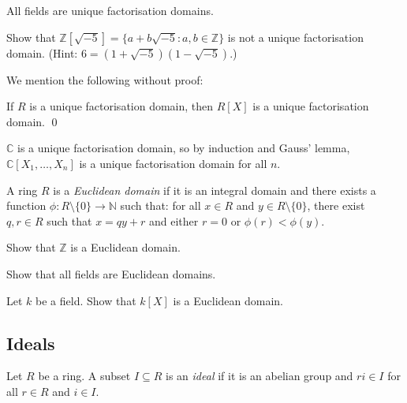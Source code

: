 \documentclass[a4paper,11pt]{article}
\begin{document}
    \begin{example}
      All fields are unique factorisation domains.
    \end{example}

    \begin{exercise}
      Show that \(\mathbb{Z}[\sqrt{-5}] = \{a + b\sqrt{-5} : a,b \in \mathbb{Z}\}\) is not a unique factorisation domain. (Hint: \(6 = (1 + \sqrt{-5})(1 - \sqrt{-5})\).)
    \end{exercise}

    We mention the following without proof:

    \begin{theorem}
      If \(R\) is a unique factorisation domain, then \(R[X]\) is a unique factorisation domain. \qed
    \end{theorem}

    \begin{example}
      \(\mathbb{C}\) is a unique factorisation domain, so by induction and Gauss' lemma, \(\mathbb{C}[X_1, \dots, X_n]\) is a unique factorisation domain for all \(n\).
    \end{example}

    \begin{definition}
      A ring \(R\) is a \emph{Euclidean domain} if it is an integral domain and there exists a function \(\phi: R \setminus \{0\} \to \mathbb{N}\) such that: for all \(x \in R\) and \(y \in R \setminus \{0\}\), there exist \(q,r \in R\) such that \(x = qy + r\) and either \(r = 0\) or \(\phi(r) < \phi(y)\).
    \end{definition}

    \begin{exercise}
      Show that \(\mathbb{Z}\) is a Euclidean domain.
    \end{exercise}

    \begin{exercise}
      Show that all fields are Euclidean domains.
    \end{exercise}

    \begin{exercise}
      Let \(k\) be a field. Show that \(k[X]\) is a Euclidean domain.
    \end{exercise}

    \subsection{Ideals}
    \begin{definition}
      Let \(R\) be a ring. A subset \(I \subseteq R\) is an \emph{ideal} if it is an abelian group and \(ri \in I\) for all \(r \in R\) and \(i \in I\).
    \end{definition}
\end{document}
